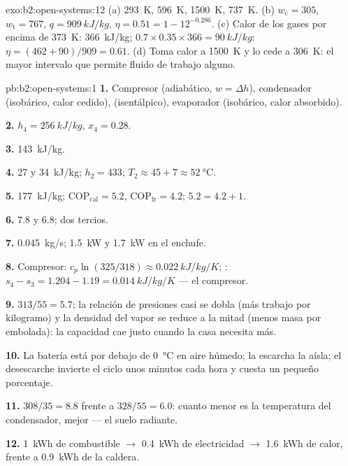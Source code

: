 \begin{solution}{exo:b2:open-systems:12}
(a) \qty{293}{K}, \qty{596}{K}, \qty{1500}{K}, \qty{737}{K}. (b) $w_{\text{c}} = 305$,
$w_{\text{t}} = 767$, $q = \qty{909}{kJ/kg}$, $\eta = 0.51 = 1 - 12^{-0.286}$. (c)
Calor de los gases por encima de \qty{373}{K}: \qty{366}{kJ/kg}; $0.7 \times 0.35 \times 366 =
\qty{90}{kJ/kg}$: $\eta = (462 + 90)/909 = 0.61$. (d) Toma calor a
\qty{1500}{K} y lo cede a \qty{306}{K}: el mayor intervalo que permite fluido
de trabajo alguno.
\end{solution}

\begin{solution}{pb:b2:open-systems:1}
\textbf{1.} Compresor (adiabático, $w = \Delta h$), condensador (isobárico, calor
cedido),  (isentálpico), evaporador (isobárico, calor absorbido).

\textbf{2.} $h_4 = \qty{256}{kJ/kg}$, $x_4 = 0.28$.

\textbf{3.} \qty{143}{kJ/kg}.

\textbf{4.} \qty{27}{} y \qty{34}{kJ/kg}; $h_2 = 433$; $T_2 \approx 45 + 7 \approx
\qty{52}{\celsius}$.

\textbf{5.} \qty{177}{kJ/kg}; $\mathrm{COP}_{\text{cal}} = 5.2$, $\mathrm{COP}_{\text{fr}} = 4.2$;
$5.2 = 4.2 + 1$.

\textbf{6.} $7.8$ y $6.8$; dos tercios.

\textbf{7.} \qty{0.045}{kg/s}; \qty{1.5}{kW} y \qty{1.7}{kW} en el enchufe.

\textbf{8.} Compresor: $c_p\ln(325/318) \approx \qty{0.022}{kJ/kg/K}$;
: $s_4 - s_3 = 1.204 - 1.19 = \qty{0.014}{kJ/kg/K}$ --- el compresor.

\textbf{9.} $313/55 = 5.7$; la relación de presiones casi se dobla (más trabajo
por kilogramo) y la densidad del vapor se reduce a la mitad (menos masa por embolada):
la capacidad cae justo cuando la casa necesita más.

\textbf{10.} La batería está por debajo de \qty{0}{\celsius} en aire húmedo; la escarcha
la aísla; el desescarche invierte el ciclo unos minutos cada hora y
cuesta un pequeño porcentaje.

\textbf{11.} $308/35 = 8.8$ frente a $328/55 = 6.0$: cuanto menor es la
temperatura del condensador, mejor --- el suelo radiante.

\textbf{12.} \qty{1}{kWh} de combustible $\to$ \qty{0.4}{kWh} de electricidad $\to$
\qty{1.6}{kWh} de calor, frente a \qty{0.9}{kWh} de la caldera.


\end{solution}
